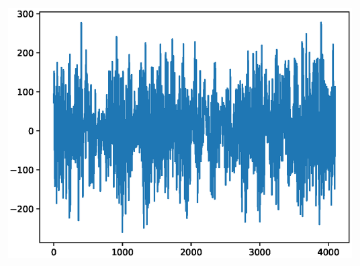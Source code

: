 \documentclass[12pt]{article}
\begin{document}
\begin{figure}
\begin{subfigure}{.25\textwidth}
\end{subfigure}%
\begin{subfigure}{.25\textwidth}
  \centering
  \includegraphics[width=.8\linewidth]{figures/signals/B/O035.eps}
\end{subfigure}


\end{figure}
\end{document}
